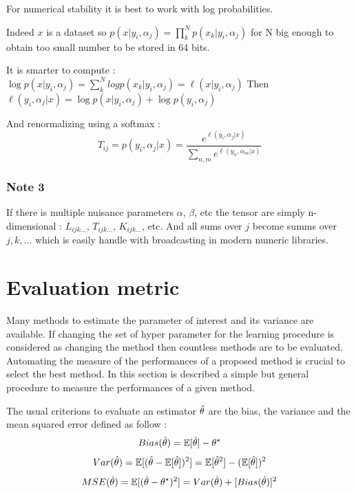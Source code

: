 For numerical stability it is best to work with log probabilities.

Indeed $x$ is a dataset so $p(x | y_i, \alpha_j) = \prod_k^N p(x_k | y_i, \alpha_j)$ for N big enough to obtain too small number to be stored in 64 bits.

It is smarter to compute : $\log p(x | y_i, \alpha_j) = \sum_k^N log p(x_k | y_i, \alpha_j) = \ell(x | y_i, \alpha_j)$
Then $\ell(y_i, \alpha_j| x) = \log p(x|y_i, \alpha_j) + \log p(y_i, \alpha_j)$

And renormalizing using a softmax :
$$ 
    T_{ij} = p(y_i, \alpha_j | x) = \frac{e^{\ell(y_i, \alpha_j| x)} }{\sum_{n,m} e^{\ell(y_n, \alpha_m| x)} }
$$


\subsubsection{Note 3}

If there is multiple nuisance parameters $\alpha$, $\beta$, etc the tensor are simply n-dimensional : $L_{ijk...}$, $T_{ijk...}$, $K_{ijk...}$, etc.
And all sums over $j$ become summs over $j,k, ...$ which is easily handle with broadcasting in modern numeric libraries.



\section{Evaluation metric} %
\label{sec:evaluation_metric}


Many methods to estimate the parameter of interest and its variance are available.
If changing the set of hyper parameter for the learning procedure is considered as changing the method then countless methods are to be evaluated.
Automating the measure of the performances of a proposed method is crucial to select the best method.
In this section is described a simple but general procedure to measure the performances of a given method.

The usual criterions to evaluate an estimator $\hat\theta$ are the bias, the variance and the mean squared error defined as follow :
\begin{equation}
  Bias(\hat\theta) = \mathbb{E}[\hat\theta] - \theta^\star
\end{equation}
\begin{equation}
  Var(\hat\theta) = \mathbb{E}[ (\hat\theta - \mathbb{E}[\hat\theta])^2 ] = \mathbb{E}[\hat\theta^2] - (\mathbb{E}[\hat\theta])^2
\end{equation}
\begin{equation}
  MSE(\hat\theta) = \mathbb{E}[(\hat\theta - \theta^\star)^2] = Var(\hat\theta) + [Bias(\hat\theta)]^2
\end{equation}

